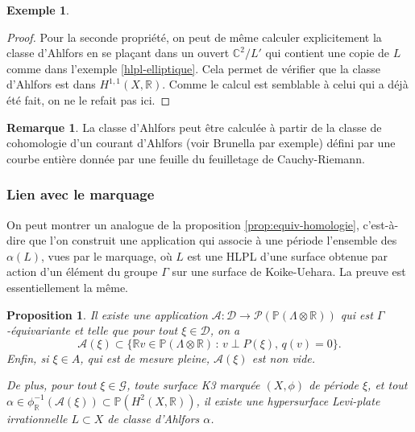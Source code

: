 \documentclass[JEP,XML,SOM,Unicode,francais,published]{cedram}
\newcommand{\R}{\mathbb{R}}
\newcommand{\C}{\mathbb{C}}
\newtheorem{prop}[thm]{Proposition}
\theoremstyle{definition}
\newtheorem{exemple}[thm]{Exemple}
\newtheorem{rem}[thm]{Remarque}
\begin{document}
\begin{exemple}
\begin{proof}
Pour la seconde propriété, on peut de même calculer explicitement la classe d'Ahlfors en se plaçant dans un ouvert $\C^2/L'$ qui contient une copie de $L$ comme dans l'exemple \ref{hlpl-elliptique}. Cela permet de vérifier que la classe d'Ahlfors est dans $H^{1, 1}(X, \R)$. Comme le calcul est semblable à celui qui a déjà été fait, on ne le refait pas ici.
\end{proof}

\begin{rem}
La classe d'Ahlfors peut être calculée à partir de la classe de cohomologie d'un courant d'Ahlfors (voir Brunella \cite{brunella1999courbes} par exemple) défini par une courbe entière donnée par une feuille du feuilletage de Cauchy-Riemann.
\end{rem}
\end{exemple}

\subsubsection*{Lien avec le marquage}

On peut montrer un analogue de la proposition \ref{prop:equiv-homologie}, c'est-à-dire que l'on construit une application qui associe à une période l'ensemble des $\alpha(L)$, vues par le marquage, où $L$ est une HLPL d'une surface obtenue par action d'un élément du groupe $\Gamma$ sur une surface de Koike-Uehara. La preuve est essentiellement la même.
\begin{prop}
\label{prop-ahlfors}
Il existe une application $\mathscr{A} \colon \mathscr{D} \to \mathscr{P}(\mathbb{P}(\Lambda \otimes \R))$ qui est $\Gamma$\nobreakdash-équi\-variante et telle que pour tout $\xi \in \mathscr{D}$, on a
\[
\mathscr{A}(\xi) \subset \bigl\{\R v \in \mathbb{P}(\Lambda\otimes \R)\,:\,v \perp P(\xi),\,q(v) = 0\bigr\}.
\]
Enfin, si $\xi \in A$, qui est de mesure pleine, $\mathscr{A}(\xi)$ est non vide.

De plus, pour tout $\xi \in \mathscr{G}$, toute surface K3 marquée $(X, \phi)$ de période $\xi$, et tout $\alpha \in \phi_{\R}^{-1}(\mathscr{A}(\xi)) \subset \mathbb{P}(H^2(X, \R))$, il existe une hypersurface Levi-plate irrationnelle $L \subset X$ de classe d'Ahlfors $\alpha$.
\end{prop}
\end{document}
